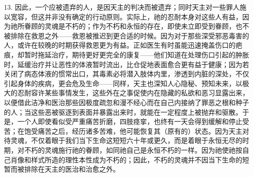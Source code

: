 13. 因此，一个应被遗弃的人，是因天主的判决而被遗弃；同时天主对一些罪人施以宽容，但这并非没有确定的行动原则。实际上，祂的忍耐本身对这些人有益，因为祂所眷顾的灵魂是不朽的；作为不朽和永恒的存在，即使未立即受到眷顾，也不被排除在救恩之外——救恩被推迟到更合适的时候。因为对于那些深受邪恶毒害的人，或许在较晚的时期获得救恩更为有益。正如医生有时虽能迅速掩盖伤口的疤痕，却暂时拖延治疗，期待更好更完全的康复——他们知道在处理伤口引起的肿胀时，延缓治疗并让恶性的体液暂时流出，比仓促地表面愈合更有益于健康；因为若关闭了病态体液的惯常出口，其毒素必将潜入肢体内里，渗透到内脏的深处，不仅引起身体的疾病，更会危及生命——同样，天主也深知人心隐秘、预知未来，以极大的忍耐容许某些事情发生，这些外在之事促使内在隐藏的私欲和恶习显露出来，以便借此洁净和医治那些因极度疏忽和漫不经心而在自己内接纳了罪恶之根和种子的人；当这些恶被驱逐到表面并暴露出来时，就能在一定程度上被抛弃和驱散。于是，一个人即使看似受严重痛苦折磨，四肢痉挛，也终有一天会得到缓解和停止受苦；在饱受痛苦之后，经历诸多苦难，他可能恢复其（原有的）状态。因为天主对待灵魂，不仅着眼于我们当下生命这短短六十年或更久，而是着眼于永恒无尽的时期，对不朽的灵魂施行祂的眷顾，如同祂自己是永恒不朽的一样。因为祂使祂按自己肖像和样式所造的理性本性成为不朽的；因此，不朽的灵魂并不因当下生命的短暂而被排除在天主的医治和治愈之外。\par

